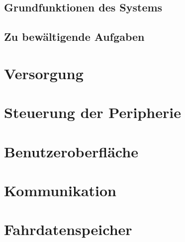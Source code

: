 \subsection{Grundfunktionen des Systems}

\subsection{Zu bewältigende Aufgaben}


\section{Versorgung}
\section{Steuerung der Peripherie}
\section{Benutzeroberfläche}
\section{Kommunikation}
\section{Fahrdatenspeicher}